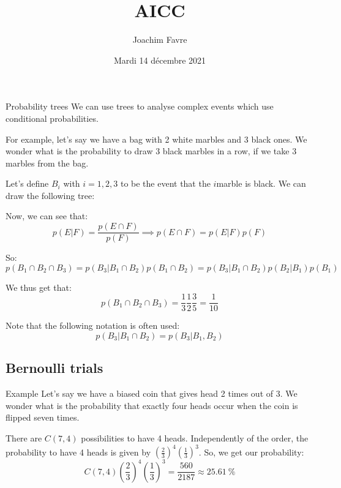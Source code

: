 \documentclass[a4paper]{article}
\title{AICC}
\author{Joachim Favre}
\date{Mardi 14 décembre 2021}
\begin{document}
\maketitle


\begin{parag}{Probability trees}
    We can use trees to analyse complex events which use conditional probabilities.

    For example, let's say we have a bag with 2 white marbles and 3 black ones. We wonder what is the probability to draw 3 black marbles in a row, if we take 3 marbles from the bag.

    Let's define $B_i$ with $i = 1, 2, 3$ to be the event that the $i$\Th marble is black. We can draw the following tree:

    Now, we can see that: 
    \[p\left(E | F\right) = \frac{p\left(E \cap F\right)}{p\left(F\right)} \implies p\left(E \cap F\right) = p\left(E | F\right)p\left(F\right)\]

    So:
    \[p\left(B_1 \cap B_2 \cap B_3\right) = p\left(B_3 |B_1 \cap B_2\right)p\left(B_1 \cap B_2\right) = p\left(B_{3}|B_1 \cap B_2\right)p\left(B_2|B_1\right)p\left(B_1\right)\]

    We thus get that: 
    \[p\left(B_1 \cap B_2 \cap B_3\right) = \frac{1}{3} \frac{1}{2} \frac{3}{5} = \frac{1}{10}\]
    
    
    Note that the following notation is often used: 
    \[p\left(B_3 | B_1 \cap B_2\right) = p\left(B_3 |B_1, B_2\right)\]
\end{parag}

\subsection{Bernoulli trials}
\begin{parag}{Example}
    Let's say we have a biased coin that gives head 2 times out of 3. We wonder what is the probability that exactly four heads occur when the coin is flipped seven times.

    There are $C\left(7, 4\right)$ possibilities to have 4 heads. Independently of the order, the probability to have 4 heads is given by $\left(\frac{2}{3}\right)^4\left(\frac{1}{3}\right)^3$. So, we get our probability: 
    \[C\left(7,4\right) \left(\frac{2}{3}\right)^4 \left(\frac{1}{3}\right)^3 = \frac{560}{2187} \approx \SI{25.61}{\percent}\]
\end{parag}
\end{document}
